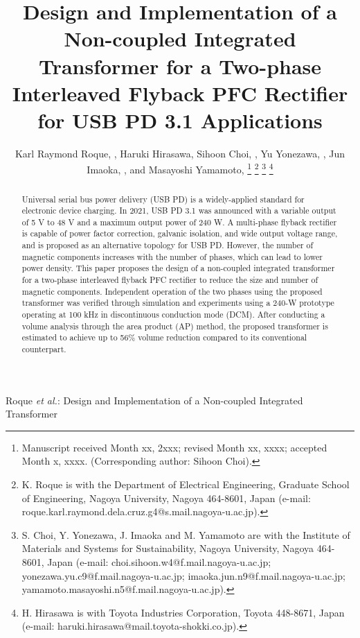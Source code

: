 \documentclass[lettersize,journal]{IEEEtran}
\begin{document}
\title{Design and Implementation of a Non-coupled Integrated Transformer for a Two-phase Interleaved Flyback PFC Rectifier for USB PD 3.1 Applications}

\author{Karl Raymond Roque, , Haruki Hirasawa, Sihoon Choi, , Yu Yonezawa, , Jun Imaoka, , and Masayoshi Yamamoto, 
\thanks{Manuscript received Month xx, 2xxx; revised Month xx, xxxx; accepted Month x, xxxx. (Corresponding author: Sihoon Choi).}
\thanks{K. Roque is with the Department of Electrical Engineering, Graduate School of Engineering, Nagoya University, Nagoya 464-8601, Japan (e-mail: roque.karl.raymond.dela.cruz.g4@s.mail.nagoya-u.ac.jp).}
\thanks{S. Choi, Y. Yonezawa, J. Imaoka and M. Yamamoto are with the Institute of Materials and Systems for Sustainability, Nagoya University, Nagoya 464-8601, Japan (e-mail: choi.sihoon.w4@f.mail.nagoya-u.ac.jp; yonezawa.yu.c9@f.mail.nagoya-u.ac.jp; imaoka.jun.n9@f.mail.nagoya-u.ac.jp; yamamoto.masayoshi.n5@f.mail.nagoya-u.ac.jp).}
\thanks{H. Hirasawa is with Toyota Industries Corporation, Toyota 448-8671, Japan (e-mail: haruki.hirasawa@mail.toyota-shokki.co.jp).}}

%
{Roque \MakeLowercase{\textit{et al.}}: Design and Implementation of a Non-coupled Integrated Transformer}

\maketitle

\begin{abstract}
Universal serial bus power delivery (USB PD) is a widely-applied standard for electronic device charging. In 2021, USB PD 3.1 was announced with a variable output of 5 V to 48 V and a maximum output power of 240 W. A multi-phase flyback rectifier is capable of power factor correction, galvanic isolation, and wide output voltage range, and is proposed as an alternative topology for USB PD. However, the number of magnetic components increases with the number of phases, which can lead to lower power density. This paper proposes the design of a non-coupled integrated transformer for a two-phase interleaved flyback PFC rectifier to reduce the size and number of magnetic components. Independent operation of the two phases using the proposed transformer was verified through simulation and experiments using a 240-W prototype operating at 100 kHz in discontinuous conduction mode (DCM). After conducting a volume analysis through the area product (AP) method, the proposed transformer is estimated to achieve up to 56\% volume reduction compared to its conventional counterpart.
\end{abstract}
\end{document}
